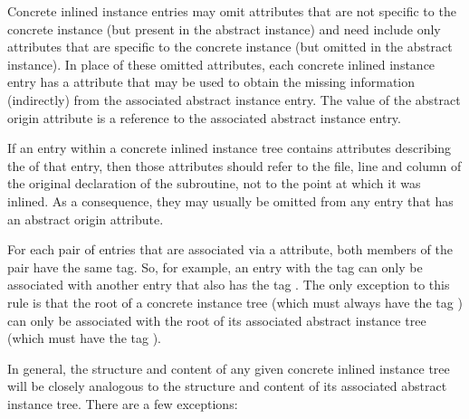 Concrete inlined instance entries may omit attributes that
are not specific to the concrete instance (but present in
the abstract instance) and need include only attributes that
are specific to the concrete instance (but omitted in the
abstract instance). In place of these omitted attributes, each
\hypertarget{chap:DWATabstractorigininlineinstance}{}
concrete inlined instance entry 
has a 
\DWATabstractorigin{}
attribute that may be used to obtain the missing information
(indirectly) from the associated abstract instance entry. The
value of the abstract origin attribute is a reference to the
associated abstract instance entry.

If an entry within a concrete inlined instance tree contains
attributes describing the 
of that entry, then those attributes should refer to the file, line
and column of the original declaration of the subroutine,
not to the point at which it was inlined. As a consequence,
they may usually be omitted from any entry that has an abstract
origin attribute.

For each pair of entries that are associated via a
\DWATabstractorigin{} attribute, both members of the pair
have the same tag. So, for example, an entry with the tag
\DWTAGvariable{} can only be associated with another entry
that also has the tag \DWTAGvariable. The only exception
to this rule is that the root of a concrete instance tree
(which must always have the tag \DWTAGinlinedsubroutine)
can only be associated with the root of its associated abstract
instance tree (which must have the tag \DWTAGsubprogram).

In general, the structure and content of any given concrete
inlined instance tree will be closely analogous to the
structure and content of its associated abstract instance
tree. There are a few exceptions:

